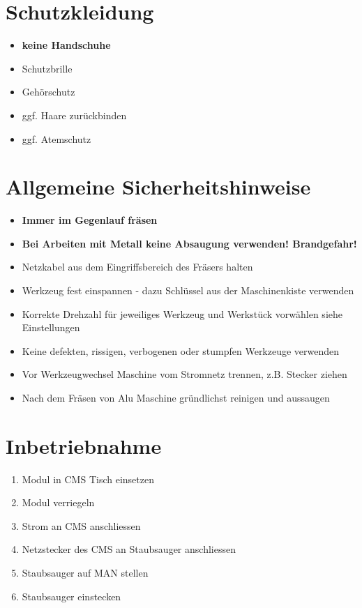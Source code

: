 \documentclass[10pt]{scrartcl}
\date{\vspace{-5ex}}
\title{\flushleft{FESTOOL Tischfr\"ase TF 1400}}
\begin{document}
\maketitle
\thispagestyle{fancy}
\section{Schutzkleidung}
\begin{itemize}
\item \textbf{keine Handschuhe}
\item Schutzbrille
\item Gehörschutz
\item ggf. Haare zurückbinden 
\item ggf. Atemschutz 
\end{itemize}
\section{Allgemeine Sicherheitshinweise}
\begin{itemize}
\item \textbf{Immer im Gegenlauf fräsen}
\item \textbf{Bei Arbeiten mit Metall keine Absaugung verwenden! Brandgefahr!}
\item Netzkabel aus dem Eingriffsbereich des Fräsers halten
\item Werkzeug fest einspannen - dazu Schlüssel aus der Maschinenkiste verwenden
\item Korrekte Drehzahl für jeweiliges Werkzeug und Werkstück vorwählen siehe Einstellungen 
\item Keine defekten, rissigen, verbogenen oder stumpfen Werkzeuge verwenden
\item Vor Werkzeugwechsel Maschine vom Stromnetz trennen, z.B. Stecker ziehen
\item Nach dem Fräsen von Alu Maschine gründlichst reinigen und aussaugen
\end{itemize}

\section{Inbetriebnahme}
\begin{enumerate}
\item Modul in CMS Tisch einsetzen
\item Modul verriegeln
\item Strom an CMS anschliessen
\item Netzstecker des CMS an Staubsauger anschliessen
\item Staubsauger auf MAN stellen
\item Staubsauger einstecken
\end{enumerate}
\end{document}

